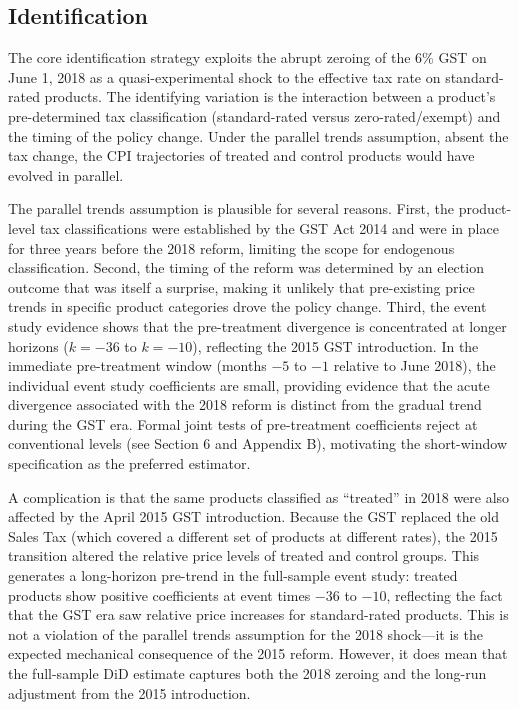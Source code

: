 \documentclass[12pt]{article}
\begin{document}
\subsection{Identification}

The core identification strategy exploits the abrupt zeroing of the 6\% GST on June 1, 2018 as a quasi-experimental shock to the effective tax rate on standard-rated products. The identifying variation is the interaction between a product's pre-determined tax classification (standard-rated versus zero-rated/exempt) and the timing of the policy change. Under the parallel trends assumption, absent the tax change, the CPI trajectories of treated and control products would have evolved in parallel.

The parallel trends assumption is plausible for several reasons. First, the product-level tax classifications were established by the GST Act 2014 and were in place for three years before the 2018 reform, limiting the scope for endogenous classification. Second, the timing of the reform was determined by an election outcome that was itself a surprise, making it unlikely that pre-existing price trends in specific product categories drove the policy change. Third, the event study evidence shows that the pre-treatment divergence is concentrated at longer horizons ($k = -36$ to $k = -10$), reflecting the 2015 GST introduction. In the immediate pre-treatment window (months $-5$ to $-1$ relative to June 2018), the individual event study coefficients are small, providing evidence that the acute divergence associated with the 2018 reform is distinct from the gradual trend during the GST era. Formal joint tests of pre-treatment coefficients reject at conventional levels (see Section 6 and Appendix B), motivating the short-window specification as the preferred estimator.

A complication is that the same products classified as ``treated'' in 2018 were also affected by the April 2015 GST introduction. Because the GST replaced the old Sales Tax (which covered a different set of products at different rates), the 2015 transition altered the relative price levels of treated and control groups. This generates a long-horizon pre-trend in the full-sample event study: treated products show positive coefficients at event times $-36$ to $-10$, reflecting the fact that the GST era saw relative price increases for standard-rated products. This is not a violation of the parallel trends assumption for the 2018 shock---it is the expected mechanical consequence of the 2015 reform. However, it does mean that the full-sample DiD estimate captures both the 2018 zeroing and the long-run adjustment from the 2015 introduction.
\end{document}
